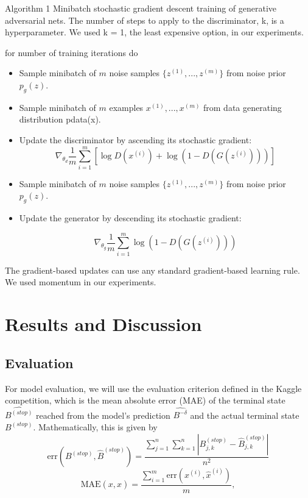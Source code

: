 \documentclass[conference]{IEEEtran}
\begin{document}
Algorithm 1 Minibatch stochastic gradient descent training of generative adversarial nets. The number of
steps to apply to the discriminator, k, is a hyperparameter. We used k = 1, the least expensive option, in our
experiments.

for number of training iterations do

\begin{itemize}
\item Sample minibatch of $m$ noise samples $\{z^{(1)}
, . . . , z^{(m)}\}$ from noise prior $p_g(z)$.
\item Sample minibatch of $m$ examples ${x
^{(1)}
, . . . , x^{(m)}}$ from data generating distribution
pdata(x).
\item Update the discriminator by ascending its stochastic gradient:
$$\nabla_{\theta_d} \frac{1}{m} \sum_{i=1}^{m} \left[ \log D(x^{(i)}) + \log \left(1 - D(G(z^{(i)}))\right) \right] $$
\item Sample minibatch of $m$ noise samples $\{z
^{(1)}
, . . . , z^{(m)}\}$ from noise prior $p_g(z)$.
\item Update the generator by descending its stochastic gradient:

$$\nabla_{\theta_g} \frac{1}{m} \sum_{i=1}^{m} \log \left(1 - D(G(z^{(i)})) \right) $$
\end{itemize}

The gradient-based updates can use any standard gradient-based learning rule. We used momentum in our experiments.



\section{Results and Discussion}

\subsection{Evaluation}
\label{evaluation}
For model evaluation, we will use the evaluation criterion defined in the Kaggle competition, which is the mean absolute error (MAE) of the terminal state $\hat{B^{(stop)}}$ reached from the model's prediction $\hat{B^{-\delta}}$ and the actual terminal state $B^{(stop)}$. Mathematically, this is given by
$$\mathrm{err}(B^{(stop)}, \hat B^{(stop)}) = \frac{ \sum_{j=1}^{n}\sum_{k=1}^{n}|B_{j,k}^{(stop)} - \hat B_{j,k}^{(stop)}|}{n^2}$$
$$\mathrm{MAE}(x, \hat x) = \frac{\sum_{i=1}^{m} \mathrm{err}(x^{(i)}, \hat x^{(i)})}{m},$$
\end{document}
